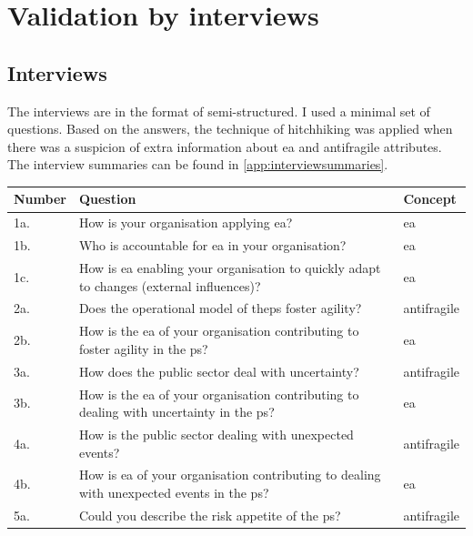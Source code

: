 \chapter{Validation by interviews}
\label{ch:validationbyinterviews}

\section{Interviews}
\label{sec:interviews}
The interviews are in the format of semi-structured. I used a minimal set of questions. Based on the answers, the technique of hitchhiking was applied when there was a suspicion of extra information about \acrshort{ea} and \gls{antifragile} attributes. The interview summaries can be found in \cref{app:interviewsummaries}.

\begin{table}[!h]
	\label{tab:interviewquestions}
	\begin{center}
			\begin{tabular}{@{}p{}p{}p{}@{}}
				\toprule
				\textbf{Number} & \textbf{Question} & \textbf{Concept} \\ \midrule %
				1a. & How is your organisation applying \acrshort{ea}? & \acrshort{ea} \\%
				1b. & Who is accountable for \acrshort{ea} in your organisation? & \acrshort{ea} \\%
				1c. & How is \acrshort{ea} enabling your organisation to quickly adapt to changes (external influences)? & \acrshort{ea} \\%
				2a. & Does the operational model of the\gls{ps} \gls{foster} \gls{agility}? & \Gls{antifragile} \\%
				2b. & How is the \acrshort{ea} of your organisation contributing to \gls{foster} \gls{agility} in the \gls{ps}? & \acrshort{ea} \\%
				3a. & How does the public sector deal with \gls{uncertainty}? & \Gls{antifragile} \\%
				3b. & How is the \acrshort{ea} of your organisation contributing to dealing with \gls{uncertainty} in the \gls{ps}?
				 & \acrshort{ea} \\%
				4a. & How is the public sector dealing with unexpected events? & \Gls{antifragile} \\%
				4b. & How is \acrshort{ea} of your organisation contributing to dealing with unexpected events in the \gls{ps}? & \acrshort{ea} \\%
				5a. & Could you describe the risk appetite of the \gls{ps}? & \Gls{antifragile} \\%

\end{tabular}
\end{center}
\end{table}
